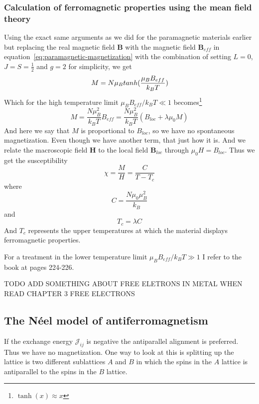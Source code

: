 \documentclass[11pt]{article}
\begin{document}
\subsubsection{Calculation of ferromagnetic properties using the mean field theory}
Using the exact same arguments as we did for the paramagnetic materials earlier but replacing the real magnetic field $\pmb{B}$ with the magnetic field $\pmb{B}_{eff}$ in equation~\ref{eq:paramagnetic-magnetization} with the combination of setting $L=0$, $J=S=\frac{1}{2}$ and $g=2$ for simplicity, we get
\begin{equation}
	M = N\mu_B \\tanh(\frac{\mu_B B_{eff}}{k_B T})
\end{equation}
Which for the high temperature limit $\mu_B B_{eff}/k_B T \ll 1$ becomes\footnote{$\tanh(x) \approx x$}
\begin{equation}
	M = \frac{N \mu_B^2}{k_B T} B_{eff} = \frac{N \mu_B^2}{k_B T} (B_{loc} + \lambda \mu_0 M)
\end{equation}
And here we say that $M$ is proportional to $B_{loc}$, so we have no spontaneous magnetization. Even though we have another term, that just how it is. And we relate the macroscopic field $\pmb{H}$ to the local field $\pmb{B}_{loc}$ through $\mu_0H = B_{loc}$. Thus we get the susceptibility 
\begin{equation}
	\chi = \frac{M}{H} = \frac{C}{T-T_c}
\end{equation}
where 
\begin{equation}
	C = \frac{N\mu_0 \mu_B^2}{k_B}
\end{equation}
and 
\begin{equation}
	T_c = \lambda C
\end{equation}
And $T_c$ represents the upper temperatures at which the material displays ferromagnetic properties.

For a treatment in the lower temperature limit $\mu_B B_{eff}/k_B T \gg 1$ I refer to the book at pages 224-226.

TODO ADD SOMETHING ABOUT FREE ELETRONS IN METAL WHEN READ CHAPTER 3 FREE ELECTRONS

\subsection{The Néel model of antiferromagnetism}
If the exchange energy $\mathscr{J}_{ij}$ is negative the antiparallel alignment is preferred. Thus we have no magnetization. One way to look at this is splitting up the lattice is two different sublattices $A$ and $B$ in which the spins in the $A$ lattice is antiparallel to the spins in the $B$ lattice.
\end{document}

